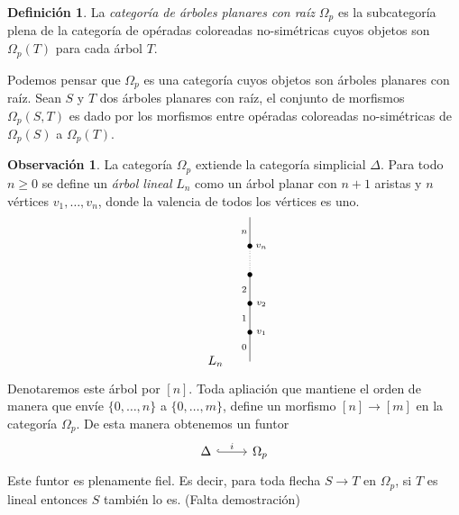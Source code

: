 \documentclass[11pt,a4paper,openright,oneside]{article}
\numberwithin{equation}{section}
\theoremstyle{definition}
\newtheorem{defi}[teo]{Definici\'on}
\newtheorem{obs}[teo]{Observaci\'on}
\begin{document}
\begin{defi}
    La \emph{categor\'ia de \'arboles planares con ra\'iz} $\Omega_p$ es la subcategor\'ia plena de la categor\'ia de op\'eradas coloreadas no-sim\'etricas cuyos objetos son $\Omega_p(T)$ para cada \'arbol $T$.

    Podemos pensar que $\Omega_p$ es una categor\'ia cuyos objetos son \'arboles planares con ra\'iz.
    Sean $S$ y $T$ dos \'arboles planares con ra\'iz, el conjunto de morfismos $\Omega_p(S, T)$ es dado por los morfismos entre op\'eradas coloreadas no-sim\'etricas de $\Omega_p(S)$ a $\Omega_p(T)$.
\end{defi}
\begin{obs}
    La categor\'ia $\Omega_p$ extiende la categor\'ia simplicial $\Delta$. Para todo $n\ge 0$ se define un \emph{\'arbol lineal} $L_n$ como un \'arbol planar con $n+1$ aristas y $n$ v\'ertices $v_1,\dots,v_n$, donde la valencia de todos los v\'ertices es uno.
    \begin{equation}
        \xy
        <0.08cm, 0cm>:
        (0.0, 0.0)*{}="1"; %
        (0.0, 10.0)*=0{\bullet}="2"; %
        (0.0, 20.0)*=0{\bullet}="3"; %
        (0.0, 30.0)*=0{\bullet}="4"; %
        (0.0, 40.0)*=0{\bullet}="5"; %
        (0.0, 50.0)*{}="6"; %
        "1";"2" **\dir{-};
        "2";"3" **\dir{-};
        "3";"4" **\dir{-};
        "4";"5" **\dir{.};
        "5";"6" **\dir{-};
        (4.0, 10.0)*=0{\scriptstyle v_1};
        (4.0, 20.0)*=0{\scriptstyle v_2};
        (4.0, 40.0)*=0{\scriptstyle v_n};
        (-2.0, 5.0)*=0{\scriptstyle 0};
        (-2.0, 15.0)*=0{\scriptstyle 1};
        (-2.0, 25.0)*=0{\scriptstyle 2};
        (-2.0, 45.0)*=0{\scriptstyle n};
        (-12,0)*{L_n};
        \endxy
    \end{equation}

    Denotaremos este \'arbol por $[n]$. Toda apliaci\'on que mantiene el orden de manera que env\'ie $\{0,\dots,n\}$ a $\{0,\dots,m\}$, define un morfismo $[n] \to [m]$ en la categor\'ia $\Omega_p$. De esta manera obtenemos un funtor
    \[
        \begin{tikzcd}
            \Delta \arrow[hook]{r}{i} & \Omega_p
        \end{tikzcd}
    \]
    Este funtor es plenamente fiel. Es decir, para toda flecha $S \to T$ en $\Omega_p$, si $T$ es lineal entonces $S$ tambi\'en lo es. (Falta demostraci\'on)
\end{obs}
\end{document}
